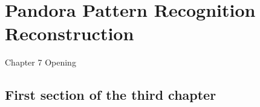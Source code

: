 
\chapter{Pandora Pattern Recognition Reconstruction}

\ifpdf
    \graphicspath{{Chapter7/Figs/Raster/}{Chapter7/Figs/PDF/}{Chapter7/Figs/}}
\else
    \graphicspath{{Chapter7/Figs/Vector/}{Chapter7/Figs/}}
\fi


Chapter 7 Opening


\section{First section of the third chapter}
